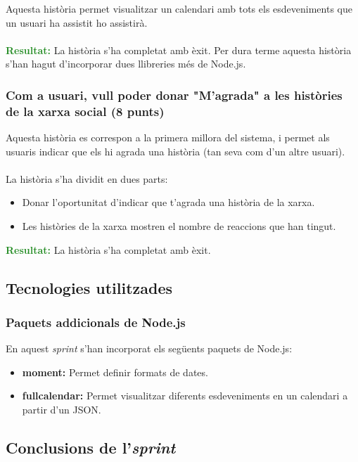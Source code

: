 \documentclass[11pt,catalan,listoffigures,listoftables]{tfgetsinf}
\begin{document}
Aquesta història permet visualitzar un calendari amb tots els esdeveniments que un usuari ha assistit ho assistirà.\\ \\
\textcolor{forestgreen}{\textbf{Resultat:}} La història s'ha completat amb èxit. Per dura terme aquesta història s'han hagut d'incorporar dues llibreries més de Node.js.

\subsubsection{Com a usuari, vull poder donar "M'agrada" a les històries de la xarxa social (8 punts)}

Aquesta història es correspon a la primera millora del sistema, i permet als usuaris indicar que els hi agrada una història (tan seva com d'un altre usuari).\\ \\
La història s'ha dividit en dues parts:
\begin{itemize}
\item Donar l'oportunitat d'indicar que t'agrada una història de la xarxa.
\item Les històries de la xarxa mostren el nombre de reaccions que han tingut.
\end{itemize}
\textcolor{forestgreen}{\textbf{Resultat:}} La història s'ha completat amb èxit.

\subsection{Tecnologies utilitzades}

\subsubsection{Paquets addicionals de Node.js}

En aquest \textit{sprint} s'han incorporat els següents paquets de Node.js:
\begin{itemize}
\item \textbf{moment:} Permet definir formats de dates.
\item \textbf{fullcalendar:} Permet visualitzar diferents esdeveniments en un calendari a partir d'un JSON.
\end{itemize}

\subsection{Conclusions de l'\textit{sprint}}
\end{document}
